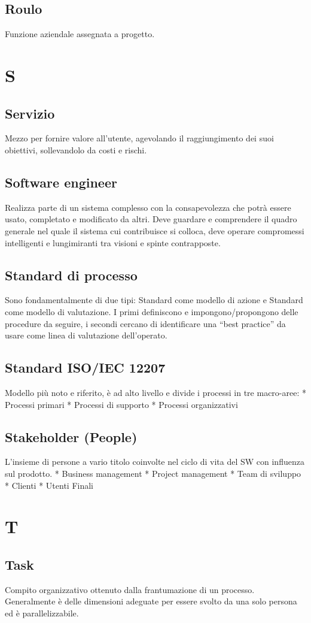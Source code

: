 \documentclass[a4paper]{report}
\newcommand{\mychapter}[2]{
	\setcounter{chapter}{#1}
	\setcounter{section}{0}
	\setcounter{subsection}{1}
	\chapter*{#2}
	\addcontentsline{toc}{chapter}{#2}
}
\begin{document}
\section{Roulo} Funzione aziendale assegnata a progetto.

\mychapter{13}{S}

\section{Servizio} Mezzo per fornire valore all'utente, agevolando il raggiungimento dei suoi obiettivi, sollevandolo da costi e rischi.
\section{Software engineer} Realizza parte di un sistema complesso con la consapevolezza che potrà essere usato, completato e modificato da altri. Deve guardare e comprendere il quadro generale nel quale il sistema cui contribuisce si colloca, deve operare compromessi intelligenti e lungimiranti tra visioni e spinte contrapposte.
\section{Standard di processo} Sono fondamentalmente di due tipi: Standard come modello di azione e Standard come modello di valutazione. I primi definiscono e impongono/propongono delle procedure da seguire, i secondi cercano di identificare una “best practice” da usare come linea di valutazione dell’operato.
\section{Standard ISO/IEC 12207} Modello più noto e riferito, è ad alto livello e divide i processi in tre macro-aree:
  * Processi primari
  * Processi di supporto
  * Processi organizzativi
\section{Stakeholder (People)} L’insieme di persone a vario titolo coinvolte nel ciclo di vita del SW con influenza sul prodotto.
  * Business management
  * Project management
  * Team di sviluppo
  * Clienti
  * Utenti Finali

\mychapter{14}{T}

\section{Task} Compito organizzativo ottenuto dalla frantumazione di un processo. Generalmente è delle dimensioni adeguate per essere svolto da una solo persona ed è parallelizzabile.
\end{document}
